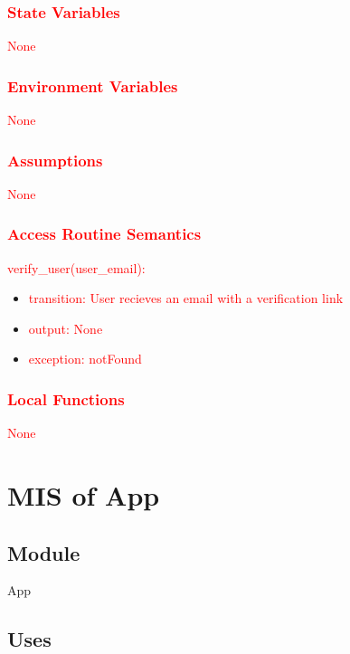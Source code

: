 \documentclass[12pt, titlepage]{article}
\begin{document}
\subsubsection{\textcolor{red}{State Variables}}

\textcolor{red}{None}

\subsubsection{\textcolor{red}{Environment Variables}}

\textcolor{red}{None}

\subsubsection{\textcolor{red}{Assumptions}}

\textcolor{red}{None}

\subsubsection{\textcolor{red}{Access Routine Semantics}}

\noindent \textcolor{red}{verify\_user(user\_email):}
\begin{itemize}
\item \textcolor{red}{transition: User recieves an email with a verification link}
\item \textcolor{red}{output: None}
\item \textcolor{red}{exception: notFound}
\end{itemize}

\subsubsection{\textcolor{red}{Local Functions}}

\textcolor{red}{None}

\newpage

\section{MIS of App} \label{AppModule}

\subsection{Module}

App

\subsection{Uses}
\end{document}
